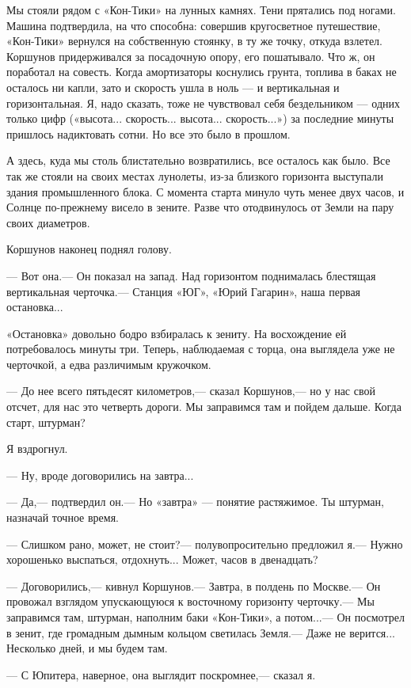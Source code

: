 \documentclass[11pt,a4paper,oneside]{article}
\begin{document}
Мы стояли рядом с «Кон-Тики» на лунных камнях. Тени прятались под ногами. Машина подтвердила, на что способна: совершив кругосветное путешествие, «Кон-Тики» вернулся на собственную стоянку, в ту же точку, откуда взлетел. Коршунов придерживался за посадочную опору, его пошатывало. Что ж, он поработал на совесть. Когда амортизаторы коснулись грунта, топлива в баках не осталось ни капли, зато и скорость ушла в ноль — и вертикальная и горизонтальная. Я, надо сказать, тоже не чувствовал себя бездельником — одних только цифр («высота... скорость... высота... скорость...») за последние минуты пришлось надиктовать сотни. Но все это было в прошлом.

А здесь, куда мы столь блистательно возвратились, все осталось как было. Все так же стояли на своих местах лунолеты, из-за близкого горизонта выступали здания промышленного блока. С момента старта минуло чуть менее двух часов, и Солнце по-прежнему висело в зените. Разве что отодвинулось от Земли на пару своих диаметров.

Коршунов наконец поднял голову.

— Вот она.— Он показал на запад. Над горизонтом поднималась блестящая вертикальная черточка.— Станция «ЮГ», «Юрий Гагарин», наша первая остановка...

«Остановка» довольно бодро взбиралась к зениту. На восхождение ей потребовалось минуты три. Теперь, наблюдаемая с торца, она выглядела уже не черточкой, а едва различимым кружочком.

— До нее всего пятьдесят километров,— сказал Коршунов,— но у нас свой отсчет, для нас это четверть дороги. Мы заправимся там и пойдем дальше. Когда старт, штурман?

Я вздрогнул.

— Ну, вроде договорились на завтра...

— Да,— подтвердил он.— Но «завтра» — понятие растяжимое. Ты штурман, назначай точное время.

— Слишком рано, может, не стоит?— полувопросительно предложил я.— Нужно хорошенько выспаться, отдохнуть... Может, часов в двенадцать?

— Договорились,— кивнул Коршунов.— Завтра, в полдень по Москве.— Он провожал взглядом упускающуюся к восточному горизонту черточку.— Мы заправимся там, штурман, наполним баки «Кон-Тики», а потом...— Он посмотрел в зенит, где громадным дымным кольцом светилась Земля.— Даже не верится... Несколько дней, и мы будем там.

— С Юпитера, наверное, она выглядит поскромнее,— сказал я.
\end{document}
